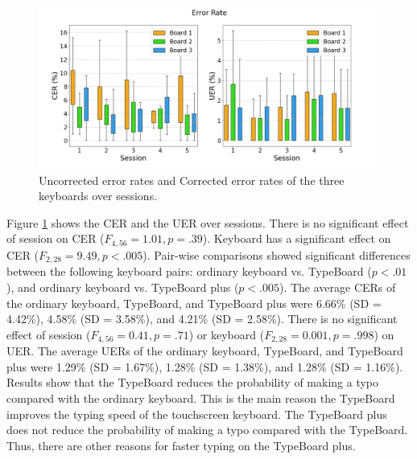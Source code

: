 \begin{figure}[!tbh]
	\includegraphics[width=1.0\linewidth]{figures/error_rate.png}
	\centering
	\caption{Uncorrected error rates and Corrected error rates of the three keyboards over sessions.}
	\label{fig:error_rate}
\end{figure}

Figure \ref{fig:error_rate} shows the CER and the UER over sessions. There is no significant effect of session on CER ($F_{4,56}=1.01,p=.39$). Keyboard has a significant effect on CER ($F_{2,28}=9.49,p<.005$). Pair-wise comparisons showed significant differences between the following keyboard pairs: ordinary keyboard vs. TypeBoard ($p<.01$), and ordinary keyboard vs. TypeBoard plus ($p<.005$). The average CERs of the ordinary keyboard, TypeBoard, and TypeBoard plus were 6.66\% (SD = 4.42\%), 4.58\% (SD = 3.58\%), and 4.21\% (SD = 2.58\%).
There is no significant effect of session ($F_{4,56}=0.41,p=.71$) or keyboard ($F_{2,28}=0.001,p=.998$) on UER. The average UERs of the ordinary keyboard, TypeBoard, and TypeBoard plus were 1.29\% (SD = 1.67\%), 1.28\% (SD = 1.38\%), and 1.28\% (SD = 1.16\%).
Results show that the TypeBoard reduces the probability of making a typo compared with the ordinary keyboard. This is the main reason the TypeBoard improves the typing speed of the touchscreen keyboard. The TypeBoard plus does not reduce the probability of making a typo compared with the TypeBoard. Thus, there are other reasons for faster typing on the TypeBoard plus.



